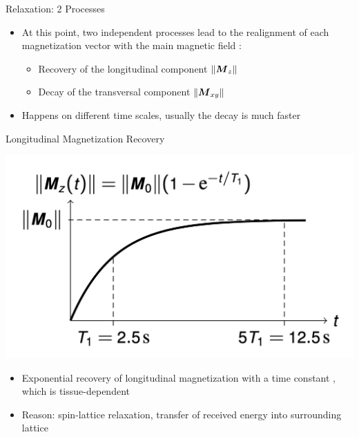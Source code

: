 \begin{frame}{Relaxation: 2 Processes}

    \begin{itemize}
        \item At this point, two independent processes lead to the realignment of each magnetization vector \magn{} with the main magnetic field :
              \begin{itemize}
                  \item Recovery of the longitudinal component $\Vert \boldsymbol{M}_z{} \Vert$
                  \item Decay of the transversal component $\Vert \boldsymbol{M}_{xy}{} \Vert$
              \end{itemize}
        \item Happens on different time scales, usually the decay is much faster
    \end{itemize}
\end{frame}

\begin{frame}{Longitudinal Magnetization Recovery}

    \begin{center}
        \includegraphics[height=0.6\textheight]{images/relaxation_longitudinal}
    \end{center}

    \begin{itemize}
        \item Exponential recovery of longitudinal magnetization with a time constant \longtime{}, which is tissue-dependent
        \item Reason: spin-lattice relaxation, transfer of received energy into surrounding lattice
    \end{itemize}
\end{frame}

